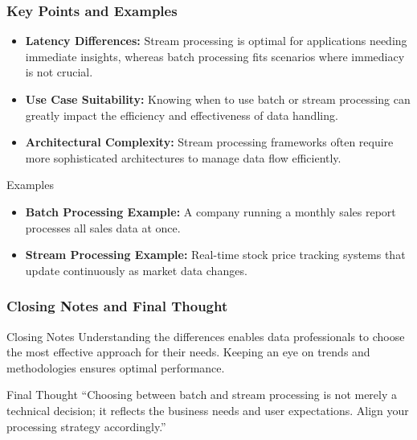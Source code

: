 \documentclass{beamer}
\begin{document}
\begin{frame}[fragile]
    \frametitle{Key Points and Examples}
    \begin{itemize}
        \item \textbf{Latency Differences:} Stream processing is optimal for applications needing immediate insights, whereas batch processing fits scenarios where immediacy is not crucial.
        
        \item \textbf{Use Case Suitability:} Knowing when to use batch or stream processing can greatly impact the efficiency and effectiveness of data handling.
        
        \item \textbf{Architectural Complexity:} Stream processing frameworks often require more sophisticated architectures to manage data flow efficiently.
    \end{itemize}
    
    \begin{block}{Examples}
        \begin{itemize}
            \item \textbf{Batch Processing Example:} A company running a monthly sales report processes all sales data at once.
            \item \textbf{Stream Processing Example:} Real-time stock price tracking systems that update continuously as market data changes.
        \end{itemize}
    \end{block}
\end{frame}

\begin{frame}[fragile]
    \frametitle{Closing Notes and Final Thought}
    \begin{block}{Closing Notes}
        Understanding the differences enables data professionals to choose the most effective approach for their needs. Keeping an eye on trends and methodologies ensures optimal performance.
    \end{block}
    
    \begin{block}{Final Thought}
        “Choosing between batch and stream processing is not merely a technical decision; it reflects the business needs and user expectations. Align your processing strategy accordingly.”
    \end{block}
\end{frame}
\end{document}
